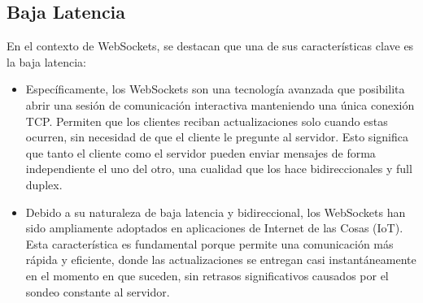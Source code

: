 \documentclass{report}
\begin{document}
\subsection{Baja Latencia}
En el contexto de WebSockets, se  destacan que una de sus características clave es la baja latencia:
\begin{itemize}
    \item Específicamente, los WebSockets son una tecnología avanzada que posibilita abrir una sesión de comunicación interactiva manteniendo 
    una única conexión TCP. Permiten que los clientes reciban actualizaciones solo cuando estas ocurren, sin necesidad de que el cliente le 
    pregunte al servidor. Esto significa que tanto el cliente como el servidor pueden enviar mensajes de forma independiente el uno del otro, 
    una cualidad que los hace bidireccionales y full duplex.
    \item Debido a su naturaleza de baja latencia y bidireccional, los WebSockets han sido ampliamente adoptados en aplicaciones de Internet 
    de las Cosas (IoT). Esta característica es fundamental porque permite una comunicación más rápida y eficiente, donde las actualizaciones 
    se entregan casi instantáneamente en el momento en que suceden, sin retrasos significativos causados por el sondeo constante al servidor.
\end{itemize}
\end{document}
